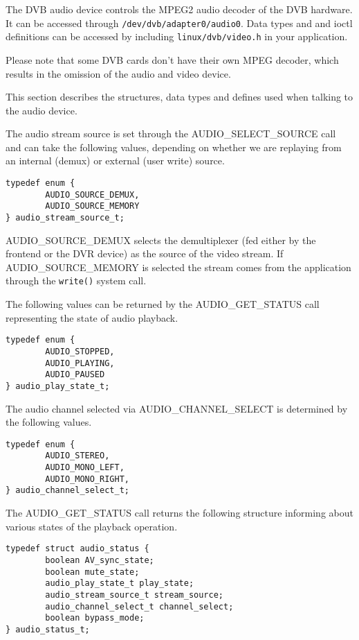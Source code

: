 
The DVB audio device controls the MPEG2 audio decoder of the DVB hardware.
It can be accessed through \texttt{/dev/dvb/adapter0/audio0}.
Data types and and ioctl definitions can be accessed by including
\texttt{linux/dvb/video.h} in your application.

Please note that some DVB cards don't have their own
MPEG decoder, which results in the omission of the audio and video
device.



This section describes the structures, data types and defines used when 
talking to the audio device.

\label{audiostreamsource}
The audio stream source is set through the AUDIO\_SELECT\_SOURCE
call and can take the following values, depending on whether we are
replaying from an internal (demux) or external (user write) source.
\begin{verbatim}
typedef enum {
        AUDIO_SOURCE_DEMUX, 
        AUDIO_SOURCE_MEMORY 
} audio_stream_source_t;
\end{verbatim}
AUDIO\_SOURCE\_DEMUX selects the demultiplexer (fed
either by the frontend or the DVR device) as the source of 
the video stream.
If AUDIO\_SOURCE\_MEMORY is selected the stream 
comes from the application through the \texttt{write()} 
system call.

The following values can be returned by the AUDIO\_GET\_STATUS call
representing the state of audio playback.
\label{audioplaystate}
\begin{verbatim}
typedef enum { 
        AUDIO_STOPPED,
        AUDIO_PLAYING,
        AUDIO_PAUSED  
} audio_play_state_t;
\end{verbatim}

\label{audiochannelselect}
The audio channel selected via AUDIO\_CHANNEL\_SELECT is determined by
the following values.
\begin{verbatim}
typedef enum {
        AUDIO_STEREO,
        AUDIO_MONO_LEFT, 
        AUDIO_MONO_RIGHT, 
} audio_channel_select_t;
\end{verbatim}

\label{audiostatus}
The AUDIO\_GET\_STATUS call returns the following structure informing
about various states of the playback operation.
\begin{verbatim}
typedef struct audio_status { 
        boolean AV_sync_state;
        boolean mute_state;  
        audio_play_state_t play_state;
        audio_stream_source_t stream_source; 
        audio_channel_select_t channel_select;
        boolean bypass_mode;
} audio_status_t;
\end{verbatim}

